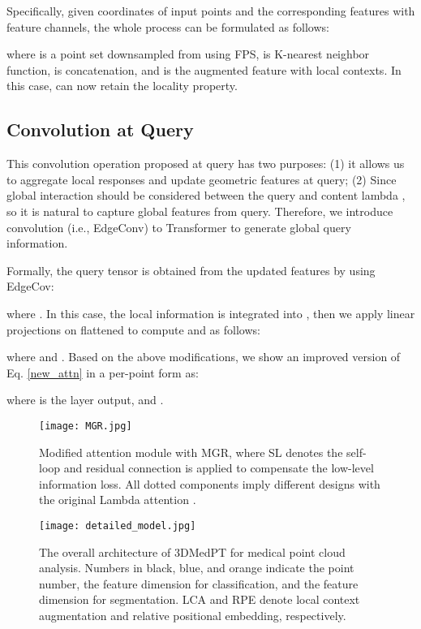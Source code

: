\documentclass[10pt,twocolumn,letterpaper]{article}
\begin{document}
Specifically, given  coordinates of  input points  and the corresponding features  with  feature channels, the whole process can be formulated as follows:

where  is a point set downsampled from  using FPS,  is K-nearest neighbor function,  is concatenation, and  is the augmented feature with local contexts.
In this case,  can now retain the locality property.



\subsection{Convolution at Query} \label{conv}
This convolution operation proposed at query has two purposes: (1) it allows us to aggregate local responses and update geometric features at query; (2) Since global interaction should be considered between the query and content lambda , so it is natural to capture global features from query.
Therefore, we introduce convolution (i.e., EdgeConv) to Transformer to generate global query information.

Formally, the query tensor is obtained from the updated features  by using EdgeCov:

where .
In this case, the local information is integrated into , then we apply linear projections on flattened  to compute  and  as follows:

where  and .
Based on the above modifications, we show an improved version of Eq. \ref{new_attn} in a per-point form as:

where  is the layer output,  and .






\begin{figure}
\centering\texttt{[image: MGR.jpg]}
\caption{Modified attention module with MGR, where SL denotes the self-loop and residual connection is applied to compensate the low-level information loss. All dotted components imply different designs with the original Lambda attention \cite{lambdanetworks}. 
} \label{fig:MGR}
\end{figure}

\begin{figure*}
\centering\texttt{[image: detailed\_model.jpg]}
\caption{
    The overall architecture of 3DMedPT for medical point cloud analysis.
    Numbers in black, \textcolor{Cerulean}{blue}, and \textcolor{BurntOrange}{orange} indicate the point number, the feature dimension for classification, and the feature dimension for segmentation.
    LCA and RPE denote local context augmentation and relative positional embedding, respectively.
} \label{fig:overall_model}
\end{figure*}
\end{document}
